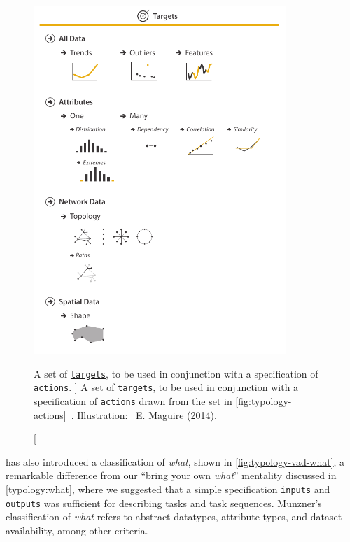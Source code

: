 \begin{figure}
	\centering
    \includegraphics[width=0.85\textwidth]{figures/fig3-6.pdf}
    \caption
    [
        A set of \underline{{\tt targets}}, to be used in conjunction with a specification of {\tt actions}.
    ]
    {
       A set of \underline{{\tt targets}}, to be used in conjunction with a specification of {\tt actions} drawn from the set in \autoref{fig:typology-actions}~\cite{Munzner2014}. Illustration: \ccLogo~E. Maguire (2014).
    }
	\centering
	\label{fig:typology-targets}
\end{figure}


\citet{Munzner2014} has also introduced a classification of {\it what}, shown in \autoref{fig:typology-vad-what}, a remarkable difference from our ``bring your own {\it what}'' mentality discussed in \autoref{typology:what}, where we suggested that a simple specification {\tt inputs} and {\tt outputs} was sufficient for describing tasks and task sequences.
Munzner's classification of {\it what} refers to abstract datatypes, attribute types, and dataset availability, among other criteria.

